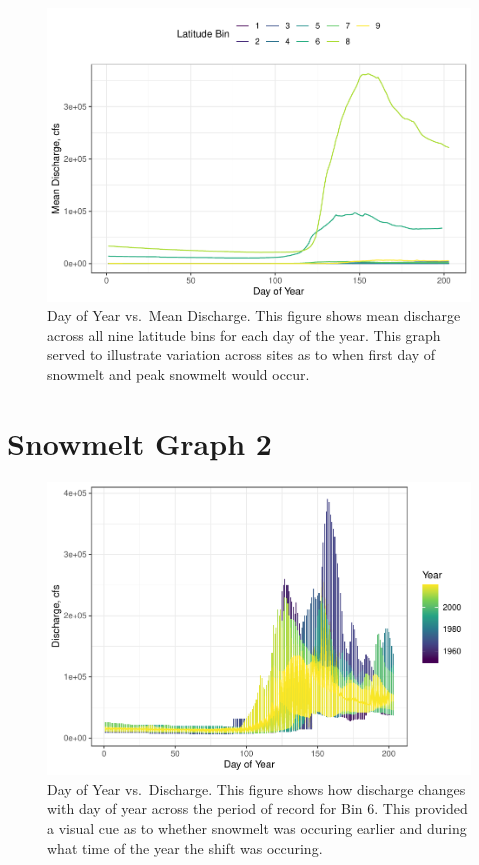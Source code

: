 \documentclass[12pt,]{article}
\begin{document}
\begin{figure}
\centering
\includegraphics{Project_Report_v2_files/figure-latex/Snowmelt Day of Year Exploratory Graph 1-1.pdf}
\caption{Day of Year vs.~Mean Discharge. This figure shows mean
discharge across all nine latitude bins for each day of the year. This
graph served to illustrate variation across sites as to when first day
of snowmelt and peak snowmelt would occur.}
\end{figure}

\hypertarget{snowmelt-graph-2}{%
\section{Snowmelt Graph 2}\label{snowmelt-graph-2}}

\begin{figure}
\centering
\includegraphics{Project_Report_v2_files/figure-latex/Snowmelt Day of Year Exploratory Graph 2-1.pdf}
\caption{Day of Year vs.~Discharge. This figure shows how discharge
changes with day of year across the period of record for Bin 6. This
provided a visual cue as to whether snowmelt was occuring earlier and
during what time of the year the shift was occuring.}
\end{figure}
\end{document}
